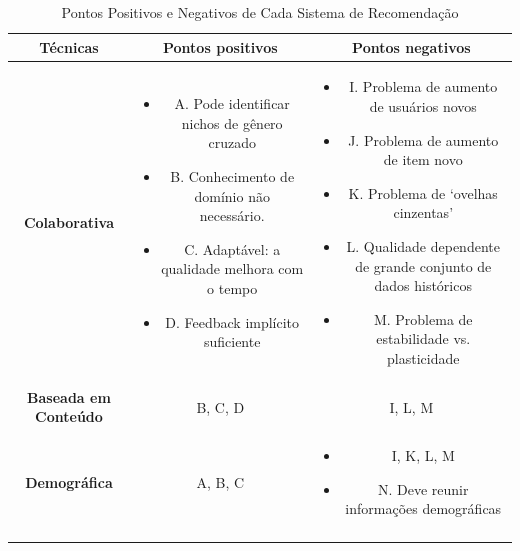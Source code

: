 \begin{table}[]
	\centering
	\caption{Pontos Positivos e Negativos de Cada Sistema de Recomendação}
	\label{tab03}
	\begin{tabular}{|c|c|c|}
	\hline
	\rowcolor[HTML]{C0C0C0} 
	\textbf{Técnicas} & \textbf{Pontos positivos } & \textbf{Pontos negativos}  \\ \hline
	\textbf{Colaborativa} & \begin{minipage} [t] {0.3\textwidth} \begin{itemize} \item 	A. Pode identificar nichos de gênero cruzado \item B. Conhecimento de domínio não necessário. \item C. Adaptável: a qualidade melhora com o tempo \item D. Feedback implícito suficiente \end{itemize} \end{minipage} & \begin{minipage} [t] {0.3\textwidth} \begin{itemize} \item	I. Problema de aumento de usuários novos \item J. Problema de aumento de item novo \item K. Problema de ‘ovelhas cinzentas’ \item L. Qualidade dependente de grande conjunto de dados históricos \item M. Problema de estabilidade vs. plasticidade\end{itemize} \end{minipage}  \\ \hline
	\rowcolor[HTML]{EFEFEF} 
	\textbf{Baseada em Conteúdo} & B, C, D & I, L, M \\ \hline
	\textbf{Demográfica} & A, B, C  & \begin{minipage} [t] {0.3\textwidth} \begin{itemize} \item I, K, L, M \item N. Deve reunir informações demográficas\end{itemize} \end{minipage} \\ \hline
	\rowcolor[HTML]{EFEFEF} 

\end{tabular}
\end{table}
